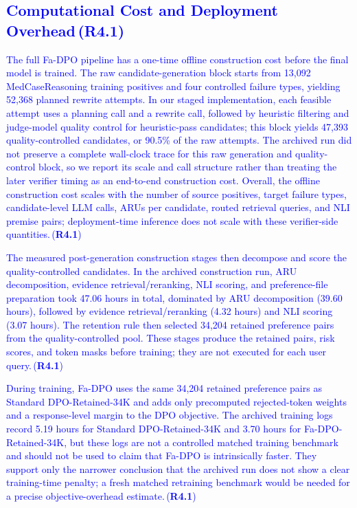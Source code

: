 \documentclass[a4paper,fleqn,doubleblind]{cas-sc}
\DeclareRobustCommand{\added}[1]{\textcolor{blue}{#1}}
\DeclareRobustCommand{\revtag}[1]{\textcolor{blue}{\scriptsize\,(\textbf{#1})}}
\begin{document}
\subsection{\added{Computational Cost and Deployment Overhead}\revtag{R4.1}}
\added{The full Fa-DPO pipeline has a one-time offline construction cost before the final model is trained. The raw candidate-generation block starts from 13,092 MedCaseReasoning training positives and four controlled failure types, yielding 52,368 planned rewrite attempts. In our staged implementation, each feasible attempt uses a planning call and a rewrite call, followed by heuristic filtering and judge-model quality control for heuristic-pass candidates; this block yields 47,393 quality-controlled candidates, or 90.5\% of the raw attempts. The archived run did not preserve a complete wall-clock trace for this raw generation and quality-control block, so we report its scale and call structure rather than treating the later verifier timing as an end-to-end construction cost. Overall, the offline construction cost scales with the number of source positives, target failure types, candidate-level LLM calls, ARUs per candidate, routed retrieval queries, and NLI premise pairs; deployment-time inference does not scale with these verifier-side quantities.}\revtag{R4.1}

\added{The measured post-generation construction stages then decompose and score the quality-controlled candidates. In the archived construction run, ARU decomposition, evidence retrieval/reranking, NLI scoring, and preference-file preparation took 47.06 hours in total, dominated by ARU decomposition (39.60 hours), followed by evidence retrieval/reranking (4.32 hours) and NLI scoring (3.07 hours). The retention rule then selected 34,204 retained preference pairs from the quality-controlled pool. These stages produce the retained pairs, risk scores, and token masks before training; they are not executed for each user query.}\revtag{R4.1}

\added{During training, Fa-DPO uses the same 34,204 retained preference pairs as Standard DPO-Retained-34K and adds only precomputed rejected-token weights and a response-level margin to the DPO objective. The archived training logs record 5.19 hours for Standard DPO-Retained-34K and 3.70 hours for Fa-DPO-Retained-34K, but these logs are not a controlled matched training benchmark and should not be used to claim that Fa-DPO is intrinsically faster. They support only the narrower conclusion that the archived run does not show a clear training-time penalty; a fresh matched retraining benchmark would be needed for a precise objective-overhead estimate.}\revtag{R4.1}
\end{document}
